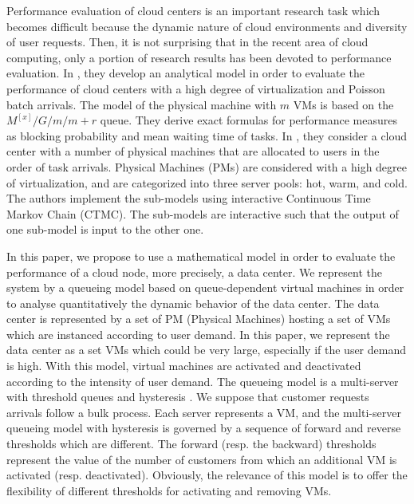 \documentclass[conference]{IEEEtran}
\begin{document}
Performance evaluation of cloud centers is an important research task which becomes difficult because the dynamic nature of cloud environments and 
diversity of user requests. Then, it is not surprising that in the recent area of cloud computing, only a portion of research results has been devoted 
to performance evaluation. In \cite{KMM12}, they develop an analytical model in order to evaluate the performance of cloud centers with a high degree 
of virtualization  and Poisson batch arrivals. The model of the physical machine with $m$ VMs is based on the $M^{[x]}/G/m/m+r$ queue. They derive 
exact formulas for performance measures  as blocking probability and mean waiting time of tasks. In \cite{KMM13}, they consider a cloud center  
with a number of physical machines that are allocated to users in the order of task arrivals. Physical Machines (PMs) are considered with a high 
degree of virtualization, and are  categorized into three server pools: hot, warm, and cold.  The authors implement the sub-models using interactive 
Continuous Time Markov Chain (CTMC). The sub-models are interactive such that the output of one sub-model is input to the other one.

In this paper, we propose to use a mathematical model in order to evaluate the performance of a cloud node, more precisely, a data center.
We represent the system by a queueing model based on queue-dependent virtual machines in order to analyse quantitatively the dynamic behavior of the 
data center.
The data center  is represented by a set of  PM (Physical Machines) hosting a set of VMs which are instanced according to user demand. In this paper,
we represent the data center as a set VMs which could be very large, especially if the user demand is high.  With this model, virtual machines are 
activated and deactivated  according to the intensity of user demand.  The queueing model is a multi-server  with  threshold queues and 
hysteresis \cite{IKei95}. We suppose that customer requests arrivals  follow  a bulk process. Each server represents a VM, and  the  multi-server 
queueing model with hysteresis  is governed by  a sequence of forward and reverse thresholds which are different. The forward (resp. the backward) 
thresholds represent the value of the number of customers from which an additional VM is activated (resp. deactivated). Obviously, the relevance of 
this  model is to offer the  flexibility  of different thresholds for activating and removing VMs.
\end{document}
